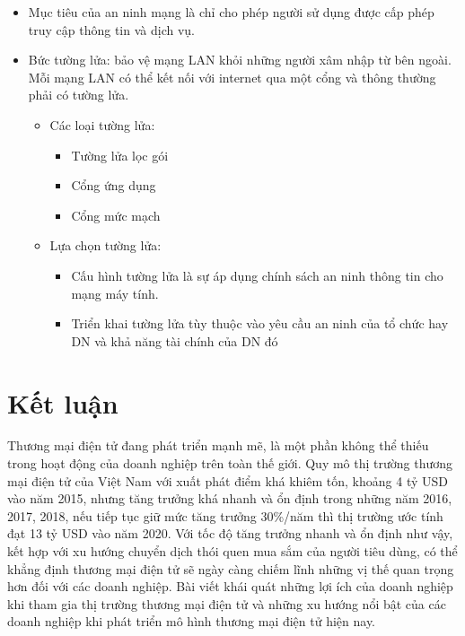 \documentclass[12pt]{article}
\begin{document}
\begin{itemize}
    \item Mục tiêu của an ninh mạng là chỉ cho phép người sử dụng được cấp phép truy cập thông tin và dịch vụ.
    \item Bức tường lửa: bảo vệ mạng LAN khỏi những người xâm nhập từ bên ngoài. Mỗi mạng LAN có thể kết nối với internet qua một cổng và thông thường phải có tường lửa.
    \begin{itemize}
        \item Các loại tường lửa:
        \begin{itemize}
            \item Tường lửa lọc gói
            \item Cổng ứng dụng
            \item Cổng mức mạch
        \end{itemize}

    \item Lựa chọn tường lửa:
        \begin{itemize}
            \item Cấu hình tường lửa là sự áp dụng chính sách an ninh thông tin cho mạng máy tính.
            \item Triển khai tường lửa tùy thuộc vào yêu cầu an ninh của tổ chức hay DN và khả năng tài chính của DN đó
        \end{itemize}  
    \end{itemize}
\end{itemize}

\section{Kết luận}

Thương mại điện tử đang phát triển mạnh mẽ, là một phần không thể thiếu trong hoạt động của doanh nghiệp trên toàn thế giới. Quy mô thị trường thương mại điện tử của Việt Nam với xuất phát điểm khá khiêm tốn, khoảng 4 tỷ USD vào năm 2015, nhưng tăng trưởng khá nhanh và ổn định trong những năm 2016, 2017, 2018, nếu tiếp tục giữ mức tăng trưởng 30\%/năm thì thị trường ước tính đạt 13 tỷ USD vào năm 2020. Với tốc độ tăng trưởng nhanh và ổn định như vậy, kết hợp với xu hướng chuyển dịch thói quen mua sắm của người tiêu dùng, có thể khẳng định thương mại điện tử sẽ ngày càng chiếm lĩnh những vị thế quan trọng hơn đối với các doanh nghiệp. Bài viết khái quát những lợi ích của doanh nghiệp khi tham gia thị trường thương mại điện tử và những xu hướng nổi bật của các doanh nghiệp khi phát triển mô hình thương mại điện tử hiện nay.
\end{document}
